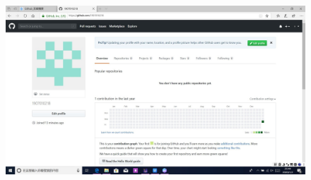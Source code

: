 \documentclass{article}
\begin{document}
    \begin{figure}[H]
    	\centering
    	\includegraphics[scale=0.4]{githup}
    	\caption{}
    	\label{fig:githup}
    \end{figure}
\end{document}
